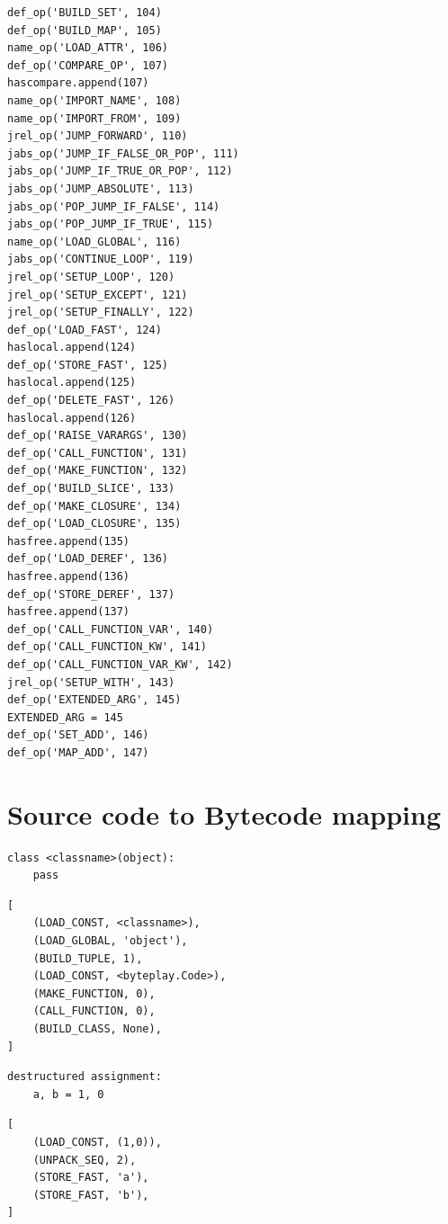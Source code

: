 \documentclass{icldt}
\numberwithin{equation}{section}       %
\begin{document}
{{\begin{multicols}{2}
\begin{lstlisting}[breaklines]
def_op('BUILD_SET', 104)
def_op('BUILD_MAP', 105)
name_op('LOAD_ATTR', 106)
def_op('COMPARE_OP', 107)
hascompare.append(107)
name_op('IMPORT_NAME', 108)
name_op('IMPORT_FROM', 109)
jrel_op('JUMP_FORWARD', 110)
jabs_op('JUMP_IF_FALSE_OR_POP', 111)
jabs_op('JUMP_IF_TRUE_OR_POP', 112)
jabs_op('JUMP_ABSOLUTE', 113)
jabs_op('POP_JUMP_IF_FALSE', 114)
jabs_op('POP_JUMP_IF_TRUE', 115)
name_op('LOAD_GLOBAL', 116)
jabs_op('CONTINUE_LOOP', 119)
jrel_op('SETUP_LOOP', 120)
jrel_op('SETUP_EXCEPT', 121)
jrel_op('SETUP_FINALLY', 122)
def_op('LOAD_FAST', 124)
haslocal.append(124)
def_op('STORE_FAST', 125)
haslocal.append(125)
def_op('DELETE_FAST', 126)
haslocal.append(126)
def_op('RAISE_VARARGS', 130)
def_op('CALL_FUNCTION', 131)
def_op('MAKE_FUNCTION', 132)
def_op('BUILD_SLICE', 133)
def_op('MAKE_CLOSURE', 134)
def_op('LOAD_CLOSURE', 135)
hasfree.append(135)
def_op('LOAD_DEREF', 136)
hasfree.append(136)
def_op('STORE_DEREF', 137)
hasfree.append(137)
def_op('CALL_FUNCTION_VAR', 140)
def_op('CALL_FUNCTION_KW', 141)
def_op('CALL_FUNCTION_VAR_KW', 142)
jrel_op('SETUP_WITH', 143)
def_op('EXTENDED_ARG', 145)
EXTENDED_ARG = 145
def_op('SET_ADD', 146)
def_op('MAP_ADD', 147)
\end{lstlisting}
\end{multicols}
\chapter{Source code to Bytecode mapping}
\label{appendix:code-to-bytecode}

\newsavebox\oneleft
\begin{lrbox}{\oneleft}
\begin{lstlisting}
class <classname>(object):
	pass
\end{lstlisting}
\end{lrbox}
\newsavebox\oneright
\begin{lrbox}{\oneright}
\begin{lstlisting}
[
	(LOAD_CONST, <classname>),
	(LOAD_GLOBAL, 'object'),
	(BUILD_TUPLE, 1),
	(LOAD_CONST, <byteplay.Code>),
	(MAKE_FUNCTION, 0),
	(CALL_FUNCTION, 0),
	(BUILD_CLASS, None),
]
\end{lstlisting}
\end{lrbox}

\newsavebox\twoleft
\begin{lrbox}{\twoleft}
\begin{lstlisting}
destructured assignment:
	a, b = 1, 0
\end{lstlisting}
\end{lrbox}
\newsavebox\tworight
\begin{lrbox}{\tworight}
\begin{lstlisting}
[
	(LOAD_CONST, (1,0)),
	(UNPACK_SEQ, 2),
	(STORE_FAST, 'a'),
	(STORE_FAST, 'b'),
]
\end{lstlisting}
\end{lrbox}

}}
\end{document}
